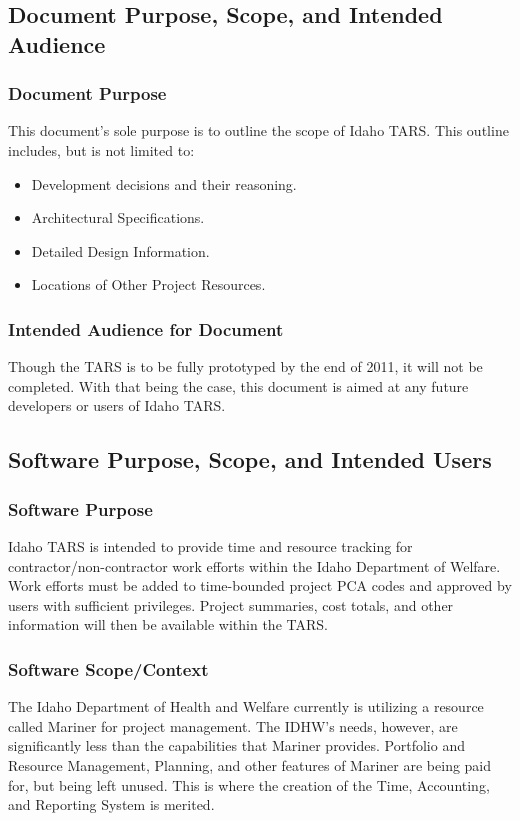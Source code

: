 \documentclass[letterpaper]{article}
\begin{document}
\subsection{\bfseries{Document Purpose, Scope, and Intended Audience}}
\subsubsection{Document Purpose}
This document's sole purpose is to outline the scope of Idaho TARS. This outline includes, but is not limited to:
\begin{itemize}
\item Development decisions and their reasoning.
\item Architectural Specifications.
\item Detailed Design Information.
\item Locations of Other Project Resources.
\end{itemize}
\subsubsection{Intended Audience for Document}
Though the TARS is to be fully prototyped by the end of 2011, it will not be completed. With that being the case, this document is aimed at any future developers or users of Idaho TARS. 

\subsection{\bfseries{Software Purpose, Scope, and Intended Users}}
\subsubsection{Software Purpose}
Idaho TARS is intended to provide time and resource tracking for contractor/non-contractor work efforts within the Idaho Department of Welfare. Work efforts must be added to time-bounded project PCA codes and approved by users with sufficient privileges. Project summaries, cost totals, and other information will then be available within the TARS.     

\subsubsection{Software Scope/Context}
The Idaho Department of Health and Welfare currently is utilizing a resource called Mariner for project management. The IDHW's needs, however, are significantly less than the capabilities that Mariner provides. Portfolio and Resource Management, Planning, and other features of Mariner are being paid for, but being left unused. This is where the creation of the Time, Accounting, and Reporting System is merited. 
\end{document}
